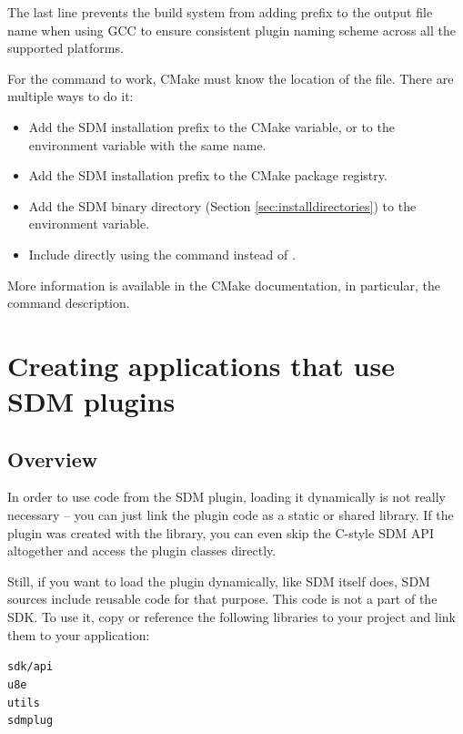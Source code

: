 \documentclass[a4paper,12pt,twoside,extrafontsizes]{memoir}
\begin{document}
The last line prevents the build system from adding  prefix to the output file name when using GCC to ensure consistent plugin naming scheme across all the supported platforms.

For the  command to work, CMake must know the location of the  file. There are multiple ways to do it:

\begin{itemize}
	\item Add the SDM installation prefix to the  CMake variable, or to the environment variable with the same name.
	\item Add the SDM installation prefix to the CMake package registry.
	\item Add the SDM binary directory (Section \ref{sec:installdirectories}) to the  environment variable.
	\item Include  directly using the  command instead of .
\end{itemize}

More information is available in the CMake documentation, in particular, the  command description.

\chapter{Creating applications that use SDM plugins}

\section{Overview}

In order to use code from the SDM plugin, loading it dynamically is not really necessary -- you can just link the plugin code as a static or shared library. If the plugin was created with the  library, you can even skip the C-style SDM API altogether and access the plugin classes directly.

Still, if you want to load the plugin dynamically, like SDM itself does, SDM sources include reusable code for that purpose. This code is not a part of the SDK. To use it, copy or reference the following libraries to your project and link them to your application:

\begin{alltt}
    sdk/api
    u8e
    utils
    sdmplug
\end{alltt}
\end{document}
